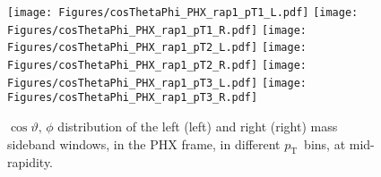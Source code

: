 \documentclass[12pt]{article}
\newcommand{\pt}{$p_{\mathrm{T}}$}
\begin{document}
%
%


\begin{figure}[htbp]
\centering
\texttt{[image: Figures/cosThetaPhi\_PHX\_rap1\_pT1\_L.pdf]}
\texttt{[image: Figures/cosThetaPhi\_PHX\_rap1\_pT1\_R.pdf]}
\texttt{[image: Figures/cosThetaPhi\_PHX\_rap1\_pT2\_L.pdf]}
\texttt{[image: Figures/cosThetaPhi\_PHX\_rap1\_pT2\_R.pdf]}
\texttt{[image: Figures/cosThetaPhi\_PHX\_rap1\_pT3\_L.pdf]}
\texttt{[image: Figures/cosThetaPhi\_PHX\_rap1\_pT3\_R.pdf]}
\caption{$\cos\vartheta,\,\phi$ distribution of the left (left) and
  right (right) mass sideband windows, in the PHX frame, in different
  \pt\ bins, at mid-rapidity.}
\end{figure}
\clearpage
\end{document}
